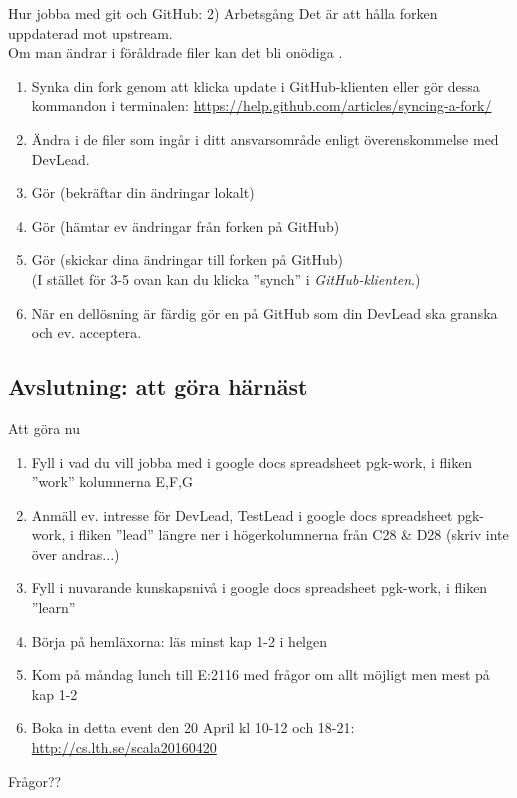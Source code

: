 \documentclass{slides}
\begin{document}
\begin{Slide}{Hur jobba med git och GitHub: 2) Arbetsgång}\footnotesize
Det är  att hålla forken uppdaterad mot upstream.\\
Om man ändrar i föråldrade filer kan det bli onödiga .
\begin{enumerate}
\item Synka din fork genom att klicka update i GitHub-klienten eller gör dessa kommandon i terminalen: \url{https://help.github.com/articles/syncing-a-fork/}
\item Ändra i de filer som ingår i ditt ansvarsområde enligt överenskommelse med DevLead.
\item Gör  (bekräftar din ändringar lokalt)
\item Gör  (hämtar ev ändringar från forken på GitHub)
\item Gör  (skickar dina ändringar till forken på GitHub) \\
(I stället för 3-5 ovan kan du klicka ''synch'' i \emph{GitHub-klienten}.)
\item När en dellösning är färdig gör en  på GitHub som din DevLead ska granska och ev. acceptera.  
\end{enumerate}
\end{Slide}

\subsection{Avslutning: att göra härnäst}
\begin{Slide}{Att göra nu}
\begin{enumerate}
\item Fyll i vad du vill jobba med i google docs spreadsheet pgk-work, i fliken ''work'' kolumnerna E,F,G
\item Anmäll ev. intresse för DevLead, TestLead i google docs spreadsheet pgk-work, i fliken ''lead'' längre ner i högerkolumnerna från C28 \& D28 (skriv inte över andras...)
\item Fyll i nuvarande kunskapsnivå i google docs spreadsheet pgk-work, i fliken ''learn''
\item Börja på hemläxorna: läs minst kap 1-2 i helgen
\item Kom på måndag lunch till E:2116 med frågor om allt möjligt men mest på kap 1-2 
\item Boka in detta event den 20 April kl 10-12 och 18-21: \\
\url{http://cs.lth.se/scala20160420}
\end{enumerate}
Frågor??
\end{Slide}
\end{document}
